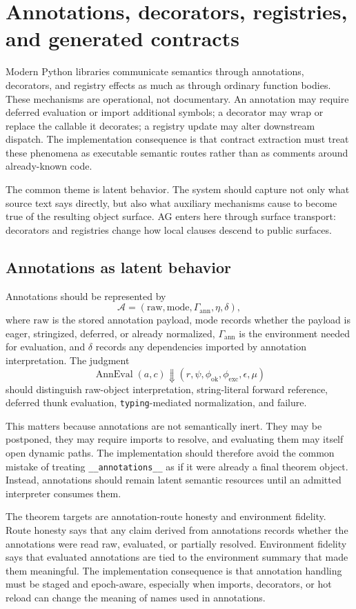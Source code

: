 \documentclass[11pt]{report}
\begin{document}
\chapter{Annotations, decorators, registries, and generated contracts}
Modern Python libraries communicate semantics through annotations, decorators, and registry effects as much as through ordinary function bodies. These mechanisms are operational, not documentary. An annotation may require deferred evaluation or import additional symbols; a decorator may wrap or replace the callable it decorates; a registry update may alter downstream dispatch. The implementation consequence is that contract extraction must treat these phenomena as executable semantic routes rather than as comments around already-known code.

The common theme is latent behavior. The system should capture not only what source text says directly, but also what auxiliary mechanisms cause to become true of the resulting object surface. AG enters here through surface transport: decorators and registries change how local clauses descend to public surfaces.
\section{Annotations as latent behavior}
Annotations should be represented by
\[
\mathcal{A} = (\mathrm{raw},\mathrm{mode},\Gamma_{\mathrm{ann}},\eta,\delta),
\]
where $\mathrm{raw}$ is the stored annotation payload, $\mathrm{mode}$ records whether the payload is eager, stringized, deferred, or already normalized, $\Gamma_{\mathrm{ann}}$ is the environment needed for evaluation, and $\delta$ records any dependencies imported by annotation interpretation. The judgment
\[
\operatorname{AnnEval}(a,c) \Downarrow (r,\psi,\phi_{\mathrm{ok}},\phi_{\mathrm{exc}},\epsilon,\mu)
\]
should distinguish raw-object interpretation, string-literal forward reference, deferred thunk evaluation, \texttt{typing}-mediated normalization, and failure.

This matters because annotations are not semantically inert. They may be postponed, they may require imports to resolve, and evaluating them may itself open dynamic paths. The implementation should therefore avoid the common mistake of treating \texttt{\_\_annotations\_\_} as if it were already a final theorem object. Instead, annotations should remain latent semantic resources until an admitted interpreter consumes them.

The theorem targets are annotation-route honesty and environment fidelity. Route honesty says that any claim derived from annotations records whether the annotations were read raw, evaluated, or partially resolved. Environment fidelity says that evaluated annotations are tied to the environment summary that made them meaningful. The implementation consequence is that annotation handling must be staged and epoch-aware, especially when imports, decorators, or hot reload can change the meaning of names used in annotations.
\end{document}
